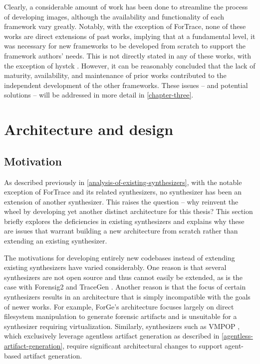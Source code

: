 \documentclass[letterpaper,12pt]{report}
\begin{document}
Clearly, a considerable amount of work has been done to streamline the
process of developing images, although the availability and
functionality of each framework vary greatly. Notably, with the
exception of ForTrace, none of these works are direct extensions of past
works, implying that at a fundamental level, it was necessary for new
frameworks to be developed from scratch to support the framework
authors' needs. This is not directly stated in any of these works, with
the exception of hystck \cite{gobelNovelApproachGenerating2020}.
However, it can be reasonably concluded that the lack of maturity,
availability, and maintenance of prior works contributed to the
independent development of the other frameworks. These issues -- and
potential solutions -- will be addressed in more detail in \autoref{chapter-three}.

\chapter{Architecture and design}\label{chapter-three}

\section{Motivation}\label{motivation}

As described previously in \autoref{analysis-of-existing-synthesizers}, with the notable exception of
ForTrace \cite{gobelForTraceHolisticForensic2022} and its related
synthesizers, no synthesizer has been an extension of another
synthesizer. This raises the question -- why reinvent the wheel by
developing yet another distinct architecture for this thesis? This
section briefly explores the deficiencies in existing synthesizers and
explains why these are issues that warrant building a new architecture
from scratch rather than extending an existing synthesizer.

The motivations for developing entirely new codebases instead of
extending existing synthesizers have varied considerably. One reason is
that several synthesizers are not open source and thus cannot easily be
extended, as is the case with Forensig2
\cite{mochForensicImageGenerator2009} and TraceGen
\cite{duTraceGenUserActivity2021}. Another reason is that the focus
of certain synthesizers results in an architecture that is simply
incompatible with the goals of newer works. For example, ForGe's
architecture \cite{vistiAutomaticCreationComputer2015} focuses
largely on direct filesystem manipulation to generate forensic artifacts
and is unsuitable for a synthesizer requiring virtualization. Similarly,
synthesizers such as VMPOP \cite{parkTREDEVMPOPCultivating2018},
which exclusively leverage agentless artifact generation as described in
\autoref{agentless-artifact-generation},
require significant architectural changes to support agent-based
artifact generation.
\end{document}
